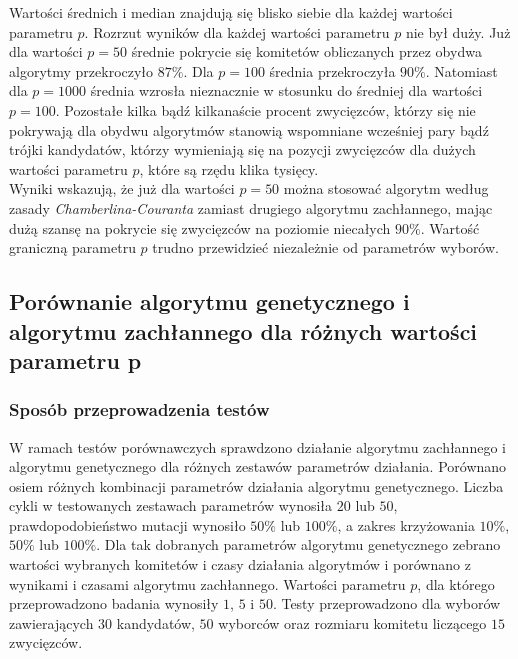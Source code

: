 \documentclass[polish,11pt]{aghthesis}
\begin{document}
\noindent Wartości średnich i median znajdują się blisko siebie dla każdej wartości parametru $p$. Rozrzut wyników dla każdej wartości parametru $p$ nie był duży. Już dla wartości $p=50$ średnie pokrycie się komitetów obliczanych przez obydwa algorytmy przekroczyło $87\%$. Dla $p=100$ średnia przekroczyła $90 \%$. Natomiast dla $p=1000$ średnia wzrosła nieznacznie w stosunku do średniej dla wartości $p=100$. Pozostałe kilka bądź kilkanaście procent zwycięzców, którzy się nie pokrywają dla obydwu algorytmów stanowią wspomniane wcześniej pary bądź trójki kandydatów, którzy wymieniają się na pozycji zwycięzców dla dużych wartości parametru $p$, które są rzędu klika tysięcy.\\
Wyniki wskazują, że już dla wartości $p=50$ można stosować algorytm według zasady \mbox{\textit{Chamberlina-Couranta}} zamiast drugiego algorytmu zachłannego, mając dużą szansę na pokrycie się zwycięzców na poziomie niecałych $90 \%$. Wartość graniczną parametru $p$ trudno przewidzieć niezależnie od parametrów wyborów. 

\subsection{Porównanie algorytmu genetycznego i algorytmu zachłannego dla różnych wartości parametru p} 

\subsubsection{Sposób przeprowadzenia testów}
W ramach testów porównawczych sprawdzono działanie algorytmu zachłannego i algorytmu genetycznego dla różnych zestawów parametrów działania. Porównano osiem różnych kombinacji parametrów działania algorytmu genetycznego. Liczba cykli w testowanych zestawach parametrów wynosiła $20$ lub $50$, prawdopodobieństwo mutacji wynosiło $50\%$ lub $100\%$, a zakres krzyżowania $10\%$, $50\%$ lub $100\%$. Dla tak dobranych parametrów algorytmu genetycznego zebrano wartości wybranych komitetów i czasy działania algorytmów i porównano z wynikami i czasami algorytmu zachłannego. Wartości parametru $p$, dla którego przeprowadzono badania wynosiły $1$, $5$ i $50$. Testy przeprowadzono dla wyborów zawierających $30$ kandydatów, $50$ wyborców oraz rozmiaru komitetu liczącego $15$ zwycięzców.   
\newpage
\end{document}
